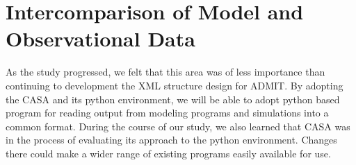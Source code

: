 \section{Intercomparison of Model and Observational Data}

As the study progressed, we felt that this area was of less
importance than continuing to development the XML structure
design for ADMIT. By adopting the CASA and its python environment,
we will be able to adopt python based program for reading output
from modeling programs and simulations into a common format.
During the course of our study, we also learned that CASA was
in the process of evaluating its approach to the python environment.
Changes there could make a wider range of existing programs
easily available for use.
